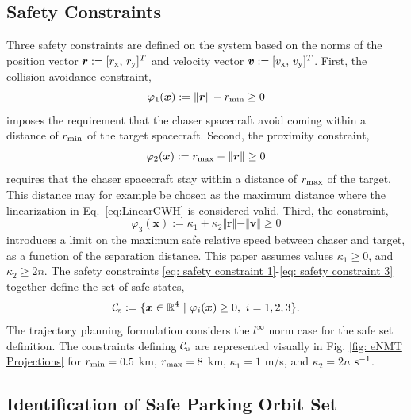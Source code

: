 \documentclass[twocolumn,letterpaper]{IEEEAerospaceCLS}  %
\theoremstyle{definition}
\begin{document}
\subsection{Safety Constraints} \label{sec: safety constraints}
Three safety constraints are defined on the system based on the norms of the position vector $\boldsymbol{r} := [r_{{\rm x}},\,r_{\rm y}]^T$ and velocity vector $\boldsymbol{v} := [v_{\rm x},\,v_{\rm y}]^T$. 
First, the collision avoidance constraint, 
\begin{equation} \label{eq: safety constraint 1}
  \varphi_1(\boldsymbol{x}) := \Vert \boldsymbol{r} \Vert - r_{\rm min} \geq 0 
\end{equation}
imposes the requirement that the chaser spacecraft avoid coming within a distance of $r_{\rm min}$ of the target spacecraft. 
Second, the proximity constraint, 
\begin{equation} \label{eq: safety constraint 2}
  \varphi_2(\boldsymbol{x}) := r_{\rm max} - \Vert \boldsymbol{r} \Vert  \geq 0 
\end{equation}
requires that the chaser spacecraft stay within a distance of $r_{\rm max}$ of the target. This distance may for example be chosen as the maximum distance where the linearization in Eq.~\eqref{eq:LinearCWH} is considered valid.
Third, the constraint,
\begin{equation} \label{eq: safety constraint 3}
  \varphi_3(\boldsymbol{x}) := \kappa _1 + \kappa_2 \Vert \boldsymbol{r} \Vert - \Vert \boldsymbol{v} \Vert \geq 0 
\end{equation}
introduces a limit on the maximum safe relative speed between chaser and target, as a function of the separation distance. 
This paper assumes values $\kappa_1\geq 0 $, and $\kappa_2 \geq 2n$. 
The safety constraints \eqref{eq: safety constraint 1}-\eqref{eq: safety constraint 3}
together define the set of safe states, 
\begin{equation}
  {\mathcal{C}}_{\rm s} := \{\boldsymbol{x} \in {\mathbb R}^4 \,\,| \,\, \varphi_i(\boldsymbol{x}) \geq 0 ,\,\, i = 1,2,3 \}. 
\end{equation}
The trajectory planning formulation considers the $l^\infty$ norm case for the safe set definition. The constraints defining ${\mathcal{C}}_{\rm s}$ are represented visually in Fig. \ref{fig: eNMT Projections} for $r_{\rm min} = 0.5 $ km, $r_{\rm max}= 8$ km, $\kappa_1 = 1$ m/s, and $\kappa_2 = 2n$ ${\rm s^{-1}}$.


\subsection{Identification of Safe Parking Orbit Set} \label{sec: ID terminal set}
\end{document}
